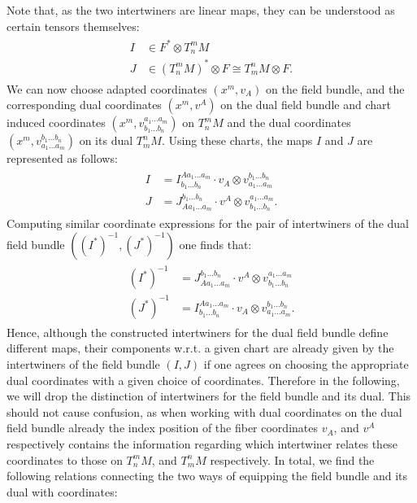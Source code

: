 Note that, as the two intertwiners are linear maps, they can be understood as certain tensors themselves: 
\begin{align}
\begin{aligned}
I &\in F^{\ast} \otimes T^m_n M\\
J &\in (T^m_nM)^{\ast} \otimes F \cong T^n_m M \otimes F.
\end{aligned}
\end{align}
We can now choose adapted coordinates $(x^m,v_A)$ on the field bundle, and the corresponding dual coordinates $(x^m, v^A)$ on the dual field bundle and chart induced coordinates $(x^m, v^{a_1 ... a_m}_{b_1 ... b_n})$ on $T^m_n M$ and the dual coordinates $(x^m, v^{b_1 ... b_n}_{a_1 ... a_m})$ on its dual $T^n_mM$. Using these charts, the maps $I$ and $J$ are represented as follows:
\begin{align} \label{interAbs}
    \begin{aligned}
    I &= I^{A a_1 ... a_m}_{b_1 ... b_n} \cdot v_A \otimes  v^{b_1 ... b_n}_{a_1 ... a_m}\\
    J &= J^{b_1 ... b_n}_{A a_1 ... a_m} \cdot v^A \otimes  v^{a_1 ... a_m}_{b_1 ... b_n}.
    \end{aligned}
\end{align}
Computing similar coordinate expressions for the pair of intertwiners of the dual field bundle $((I^{\ast})^{-1}, (J^{\ast})^{-1})$ one finds that:
\begin{align} \label{dualInterAbs}
    \begin{aligned}
         (I^{\ast})^{-1} &= J^{b_1 ... b_n}_{A a_1 ... a_m} \cdot v^A \otimes  v^{a_1 ... a_m}_{b_1 ... b_n}\\
         (J^{\ast})^{-1} &= I^{A a_1 ... a_m}_{b_1 ... b_n} \cdot v_A \otimes  v^{b_1 ... b_n}_{a_1 ... a_m}.
    \end{aligned}
\end{align} 
Hence, although the constructed intertwiners for the dual field bundle define different maps, their components w.r.t. a given chart are already given by the intertwiners of the field bundle $(I,J)$ if one agrees on choosing the appropriate dual coordinates with a given choice of coordinates. Therefore in the following, we will drop the distinction of intertwiners for the field bundle and its dual.  This should not cause confusion, as when working with dual coordinates on the dual field bundle already the index position of the fiber coordinates $v_A$, and $v^{A}$ respectively contains the information regarding which intertwiner relates these coordinates to those on $T^m_n M$, and $T^n_mM$ respectively. In total, we find the following relations connecting the two ways of equipping the field bundle and its dual with coordinates: 
